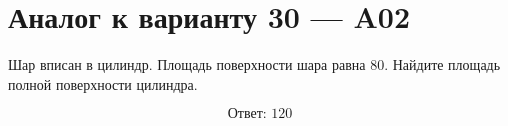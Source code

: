 \documentclass[12pt,a4paper]{article}
\begin{document}
\section*{Аналог к варианту 30 — A02}

Шар вписан в цилиндр. Площадь поверхности шара равна \(80\). Найдите площадь полной поверхности цилиндра.

\begin{center}
\end{center}

\[
\boxed{\text{Ответ: }120}
\]
\end{document}
